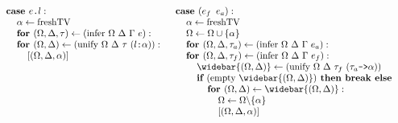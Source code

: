 \documentclass[acmsmall]{acmart}
\begin{document}
\begin{figure*}[h]
\[\begin{array}[t]{@{} l}
    \I \B{case } \code{$e$.$l$} :  
    \\
    \I\I \alpha \leftarrow \F{freshTV}
    \\
    \I\I \B{for } (\Omega, \Delta, \tau) \leftarrow (\F{infer } \Omega\ \Delta\ \Gamma\ e):
    \\
    \I\I \B{for } (\Omega, \Delta) \leftarrow (\F{unify } \Omega\ \Delta\ \tau\ (\code{$l$:$\alpha$})):
    \\
    \I\I\I [(\Omega, \Delta, \alpha)]
\end{array}
\begin{array}[t]{@{} l}
    \I \B{case } (\code{$e_f$ $e_a$}) :  
    \\
    \I\I \alpha \leftarrow \F{freshTV}
    \\
    \I\I \Omega \leftarrow \Omega \cup \{\alpha\}
    \\
    \I\I \B{for } (\Omega, \Delta, \tau_a) \leftarrow (\F{infer } \Omega\ \Delta\ \Gamma\ e_a):
    \\
    \I\I \B{for } (\Omega, \Delta, \tau_f) \leftarrow (\F{infer } \Omega\ \Delta\ \Gamma\ e_f):
    \\
    \I\I\I \widebar{(\Omega, \Delta)} \leftarrow (\F{unify } \Omega\ \Delta\ \tau_f\ (\code{$\tau_a$->$\alpha$}))
    \\
    \I\I\I \B{if } (\F{empty } \widebar{(\Omega, \Delta)}) \B{ then } \B{break} \B{ else }
    \\
    \I\I\I\I \B{for } (\Omega, \Delta) \leftarrow \widebar{(\Omega, \Delta)}:
    \\
    \I\I\I\I\I \Omega \leftarrow \Omega \backslash \{\alpha\}
    \\
    \I\I\I\I\I [(\Omega, \Delta, \alpha)]

    \\


\end{array}\]
\end{figure*}
\end{document}
